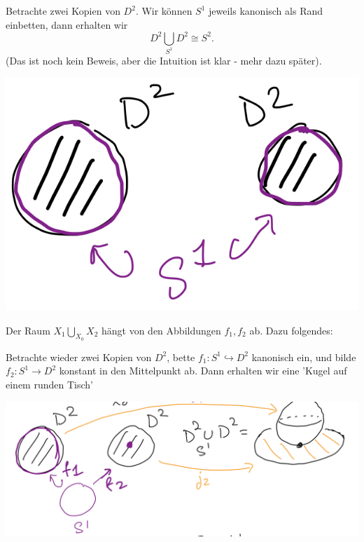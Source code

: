 \begin{example}
    Betrachte zwei Kopien von $D^2$. Wir können $S^1$ jeweils kanonisch als Rand einbetten, dann erhalten wir
     \[
    D^2 \bigcup_{S^1}D^2 \cong S^2 
    .\] 
    (Das ist noch kein Beweis, aber die Intuition ist klar - mehr dazu später).

    \begin{minipage}{\textwidth}
        \centering
        \includegraphics[scale=0.25]{figures/handdrawn/beispiel-disjunkte-vereinigung.png}
    \end{minipage}
\end{example}
\begin{warning}
    Der Raum $X_1\bigcup\limits_{X_0} X_2$ hängt von den Abbildungen $f_1,f_2$ ab. Dazu folgendes:
\end{warning}
\begin{example}
    Betrachte wieder zwei Kopien von $D^2$, bette $f_1: S^1 \hookrightarrow  D^2$ kanonisch ein, und bilde $f_2: S^1 \to  D^2$ konstant in den Mittelpunkt ab. Dann erhalten wir eine 'Kugel auf einem runden Tisch'

    \begin{minipage}{\textwidth}
        \centering
        \includegraphics[scale=0.18]{figures/handdrawn/warning-disjunkte-vereinigung.png}
    \end{minipage}
\end{example}

